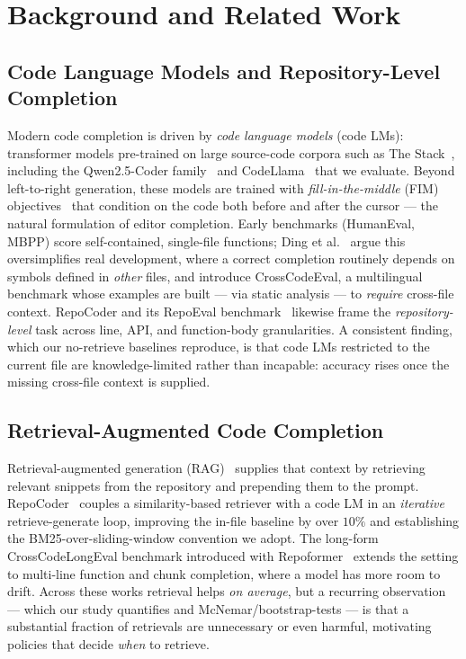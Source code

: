 \documentclass[10pt,conference]{IEEEtran}
\begin{document}
\section{Background and Related Work}
\subsection{Code Language Models and Repository-Level Completion}
Modern code completion is driven by \emph{code language models} (code LMs):
transformer models pre-trained on large source-code corpora such as The
Stack~\cite{kocetkov2022stack}, including the Qwen2.5-Coder
family~\cite{hui2024qwen25coder} and CodeLlama~\cite{roziere2023codellama} that we
evaluate. Beyond left-to-right generation, these models are trained with
\emph{fill-in-the-middle} (FIM) objectives~\cite{bavarian2022fim} that condition on
the code both before and after the cursor --- the natural formulation of editor
completion. Early benchmarks (HumanEval, MBPP) score self-contained, single-file
functions; Ding et al.~\cite{ding2023cce} argue this oversimplifies real
development, where a correct completion routinely depends on symbols defined in
\emph{other} files, and introduce CrossCodeEval, a multilingual benchmark whose
examples are built --- via static analysis --- to \emph{require} cross-file
context. RepoCoder and its RepoEval benchmark~\cite{zhang2023repocoder} likewise
frame the \emph{repository-level} task across line, API, and function-body
granularities. A consistent finding, which our no-retrieve baselines reproduce, is
that code LMs restricted to the current file are knowledge-limited rather than
incapable: accuracy rises once the missing cross-file context is supplied.

\subsection{Retrieval-Augmented Code Completion}
Retrieval-augmented generation
(RAG)~\cite{lewis2021retrievalaugmentedgenerationknowledgeintensivenlp} supplies
that context by retrieving relevant snippets from the repository and prepending
them to the prompt. RepoCoder~\cite{zhang2023repocoder} couples a similarity-based
retriever with a code LM in an \emph{iterative} retrieve-generate loop, improving
the in-file baseline by over $10\%$ and establishing the BM25-over-sliding-window
convention we adopt. The long-form CrossCodeLongEval benchmark introduced with
Repoformer~\cite{wu2024repoformer} extends the setting to multi-line function and
chunk completion, where a model has more room to drift. Across these works
retrieval helps \emph{on average}, but a recurring observation --- which our study
quantifies and McNemar/bootstrap-tests --- is that a substantial fraction of
retrievals are unnecessary or even harmful, motivating policies that decide
\emph{when} to retrieve.
\end{document}
